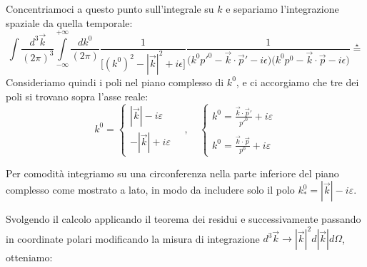 \documentclass[../main.tex]{subfiles}
\begin{document}
Concentriamoci a questo punto sull'integrale su \(k\) e separiamo l'integrazione spaziale da quella temporale:
\[
\int\frac{d^3\Vec k}{(2\pi)^3}\int\limits_{-\infty}^{+\infty}\frac{d k^0}{(2\pi)}\frac{1}{\big[(k^0)^2-|\Vec{k}|^2+i\epsilon\big]}\frac{1}{\big(k^0p'^0 -\Vec{k}\cdot\Vec p' -i\epsilon\big)\big(k^0p^0 -\Vec{k}\cdot\Vec p-i\epsilon\big)} \overset{\star}{=}
\]
Consideriamo quindi i poli nel piano complesso di \(k^0\), e ci accorgiamo che tre dei poli si trovano sopra l'asse reale:
\[
k^0 =
\begin{cases}
      |\Vec{k}| - i\varepsilon\\ 
      -|\Vec{k}| + i\varepsilon
\end{cases} \quad , \quad
\begin{cases}
    k^0 = \frac{\Vec{k}\cdot\Vec p'}{p'^0} + i\varepsilon\\ \\
    k^0 = \frac{\Vec{k}\cdot\Vec p}{p^0} + i\varepsilon
\end{cases}
\]

Per comodità integriamo su una circonferenza nella parte inferiore del piano complesso come mostrato a lato, in modo da includere solo il polo \(k^0_\ast = |\Vec{k}| - i\varepsilon\).

Svolgendo il calcolo applicando il teorema dei residui e successivamente passando in coordinate polari modificando la misura di integrazione \(d^3\Vec k \rightarrow |\Vec{k}|^2 d|\Vec{k}|d\Omega\), otteniamo:
\end{document}
